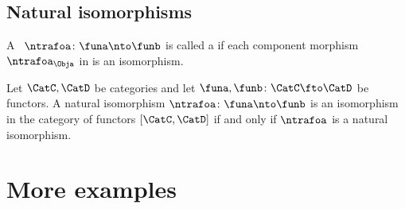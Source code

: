 \subsection{Natural isomorphisms}

\begin{ctdefinition}
    \label{def:natural-isomorphism}
    A ~$\ntrafoa \colon \funa \nto \funb $ is called a  if each component morphism ~$\ntrafoa_\Obja$ in \CatD is an isomorphism.
\end{ctdefinition}

\begin{lemma}
    Let $\CatC, \CatD$ be categories and let $\funa, \funb \colon \CatC \fto \CatD$ be functors.
    A natural isomorphism $\ntrafoa \colon \funa \nto \funb $ is an isomorphism in the category of functors $[\CatC, \CatD]$ if and only if $\ntrafoa$ is a natural isomorphism.
\end{lemma}

\clearpage

\section{More examples}



